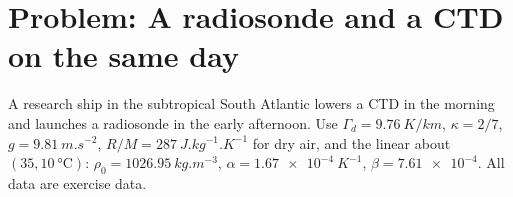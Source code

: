 \section{Problem: A radiosonde and a CTD on the same day}

\begin{problem}
\label{pb:b1:fluid-envelopes-structure:1}
A research ship in the subtropical South Atlantic lowers a CTD in the morning
and launches a radiosonde in the early afternoon. Use $\Gamma_d =
\qty{9.76}{K/km}$, $\kappa = 2/7$, $g = \qty{9.81}{m.s^{-2}}$, $R/M =
\qty{287}{J.kg^{-1}.K^{-1}}$ for dry air, and the linear  about $(35, \qty{10}{\celsius})$: $\rho_0 = \qty{1026.95}{kg.m^{-3}}$,
$\alpha = \qty{1.67e-4}{K^{-1}}$, $\beta = \num{7.61e-4}$. All data are exercise
data.


\end{problem}
